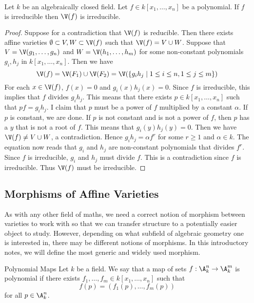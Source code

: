 \documentclass[a4paper]{article}
\begin{document}
\begin{prp}{}{} Let $k$ be an algebraically closed field. Let $f\in k[x_1,\dots,x_n]$ be a polynomial. If $f$ is irreducible then $\V(f)$ is irreducible. 
\begin{proof}
Suppose for a contradiction that $\V(f)$ is reducible. Then there exists affine varieties $\emptyset\subset V,W\subset\V(f)$ such that $\V(f)=V\cup W$. Suppose that $V=\V(g_1,\dots,g_n)$ and $W=\V(h_1,\dots,h_m)$ for some non-constant polynomials $g_i,h_j$ in $k[x_1,\dots,x_n]$. Then we have $$\V(f)=\V(F_1)\cup\V(F_2)=\V(\{g_ih_j\;|\;1\leq i\leq n, 1\leq j\leq m\})$$ For each $x\in\V(f)$, $f(x)=0$ and $g_i(x)h_j(x)=0$. Since $f$ is irreducible, this implies that $f$ divides $g_ih_j$. This means that there exists $p\in k[x_1,\dots,x_n]$ such that $pf=g_ih_j$. I claim that $p$ must be a power of $f$ multiplied by a constant $\alpha$. If $p$ is constant, we are done. If $p$ is not constant and is not a power of $f$, then $p$ has a $y$ that is not a root of $f$. This means that $g_i(y)h_j(y)=0$. Then we have $\V(f)\neq V\cup W$, a contradiction. Hence $g_ih_j=\alpha f^r$ for some $r\geq 1$ and $\alpha\in k$. The equation now reads that $g_i$ and $h_j$ are non-constant polynomials that divides $f^r$. Since $f$ is irreducible, $g_i$ and $h_j$ must divide $f$. This is a contradiction since $f$ is irreducible. Thus $\V(f)$ must be irreducible. 
\end{proof}
\end{prp}

\subsection{Morphisms of Affine Varieties}
As with any other field of maths, we need a correct notion of morphism between varieties to work with so that we can transfer structure to a potentially easier object to study. However, depending on what subfield of algebraic geometry one is interested in, there may be different notions of morphisms. In this introductory notes, we will define the most generic and widely used morphism. 

\begin{defn}{Polynomial Maps}{} Let $k$ be a field. We say that a map of sets $f:\A_k^n\to\A_k^m$ is polynomial if there exists $f_1,\dots,f_m\in k[x_1,\dots,x_n]$ such that $$f(p)=(f_1(p),\dots,f_m(p))$$ for all $p\in\A_k^n$. 
\end{defn}
\end{document}

